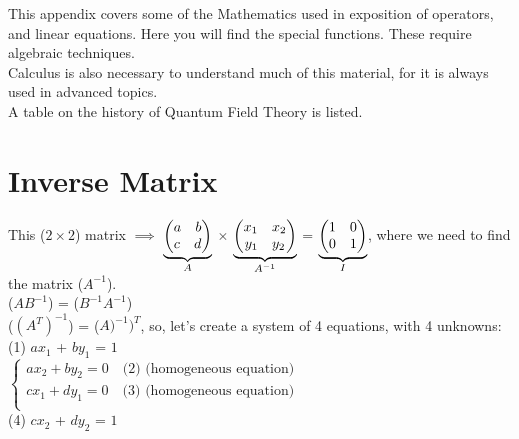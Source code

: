 \documentclass[a4paper, 10pt, onepage]{elegantbook}
\begin{document}
\begin{remark}


This appendix covers some of the  Mathematics used in  exposition of operators, and linear equations. Here you will find the special functions. These require algebraic techniques.  \\

Calculus is also necessary to understand much of this material, for it is always used in advanced topics.  \\

A table on the history of Quantum Field Theory is listed.  \\

\end{remark}

\section{Inverse Matrix}

This ($2 \times 2$) matrix $\implies$ $\underbrace{\begin{pmatrix}a \quad b \cr c \quad d \end{pmatrix}}_{A}$ $\times$ $\underbrace{\begin{pmatrix}x_{1} \quad x_{2} \cr y_{1} \quad y_{2} \end{pmatrix}}_{A^{-1}}$ = $\underbrace{\begin{pmatrix}1 \quad 0 \cr 0 \quad 1 \end{pmatrix}}_{I}$, where we need to find the matrix (${A^{-1}}$).  \\

(${AB}^{-1}$) = (${B}^{-1}{A}^{-1}$)  \\

($({A}^{T})^{-1}$) = (${A)^{-1})^T}$, so, let's create a system of 4 equations, with 4 unknowns:  \\

(1) $ax_1$ + $by_1$ = $1$  \\

$
\left\{
\begin{array}{ll}
  ax_2 + by_2 = 0 \quad  \text{(2) (homogeneous equation)} \\
  cx_1 + dy_1 = 0 \quad  \text{(3) (homogeneous equation)} \\
\end{array}
\right.$  \\

(4) $cx_2$ + $dy_2$ = $1$  \\
\end{document}
